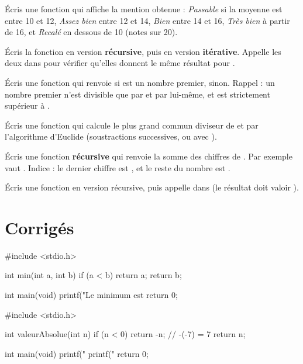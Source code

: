 Écris une fonction  qui affiche la mention
obtenue : \emph{Passable} si la moyenne est entre 10 et 12, \emph{Assez bien} entre
12 et 14, \emph{Bien} entre 14 et 16, \emph{Très bien} à partir de 16, et
\emph{Recalé} en dessous de 10 (notes sur 20).

Écris la fonction  en version \textbf{récursive}, puis en version
\textbf{itérative}. Appelle les deux dans  pour vérifier qu'elles
donnent le même résultat pour .


Écris une fonction  qui renvoie  si  est
un nombre premier,  sinon. Rappel : un nombre premier n'est divisible que
par  et par lui-même, et est strictement supérieur à .

Écris une fonction  qui calcule le plus grand commun
diviseur de  et  par l'algorithme d'Euclide (soustractions
successives, ou  avec ).

Écris une fonction \textbf{récursive}  qui renvoie la
somme des chiffres de . Par exemple  vaut
. Indice : le dernier chiffre est , et le reste
du nombre est .

Écris une fonction  en version récursive, puis appelle
 dans  (le résultat doit valoir ).

\section{Corrigés}

\begin{codec}
#include <stdio.h>

int min(int a, int b) {
    if (a < b) {
        return a;
    }
    return b;
}

int main(void) {
    printf("Le minimum est %
    return 0;
}
\end{codec}

\begin{codec}
#include <stdio.h>

int valeurAbsolue(int n) {
    if (n < 0) {
        return -n;     // -(-7) = 7
    }
    return n;
}

int main(void) {
    printf("%
    printf("%
    return 0;
}
\end{codec}

